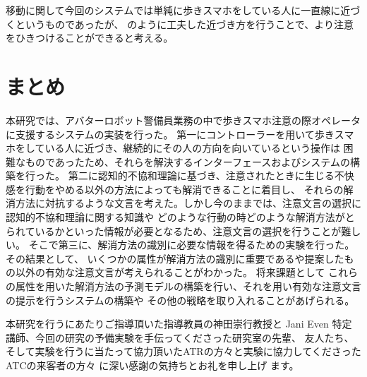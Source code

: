 \documentclass{kuisthesis}
\begin{document}
移動に関して今回のシステムでは単純に歩きスマホをしている人に一直線に近づくというものであったが、
\cite{Mizumaru2019}のように工夫した近づき方を行うことで、より注意をひきつけることができると考える。




\section{まとめ}
本研究では、アバターロボット警備員業務の中で歩きスマホ注意の際オペレータに支援するシステムの実装を行った。
第一にコントローラーを用いて歩きスマホをしている人に近づき、継続的にその人の方向を向いているという操作は
困難なものであったため、それらを解決するインターフェースおよびシステムの構築を行った。
第二に認知的不協和理論に基づき、注意されたときに生じる不快感を行動をやめる以外の方法によっても解消できることに着目し、
それらの解消方法に対抗するような文言を考えた。しかし今のままでは、注意文言の選択に認知的不協和理論に関する知識や
どのような行動の時どのような解消方法がとられているかといった情報が必要となるため、注意文言の選択を行うことが難しい。
そこで第三に、解消方法の識別に必要な情報を得るための実験を行った。その結果として、
いくつかの属性が解消方法の識別に重要であるや提案したもの以外の有効な注意文言が考えられることがわかった。
将来課題として
これらの属性を用いた解消方法の予測モデルの構築を行い、それを用い有効な注意文言の提示を行うシステムの構築や
その他の戦略を取り入れることがあげられる。

\acknowledgments %
本研究を行うにあたりご指導頂いた指導教員の神田崇行教授と Jani Even
特定講師、今回の研究の予備実験を手伝ってくださった研究室の先輩、
友人たち、そして実験を行うに当たって協力頂いたATRの方々と実験に協力してくださったATCの来客者の方々
に深い感謝の気持ちとお礼を申し上げ
ます。

\nocite{*}
\end{document}
